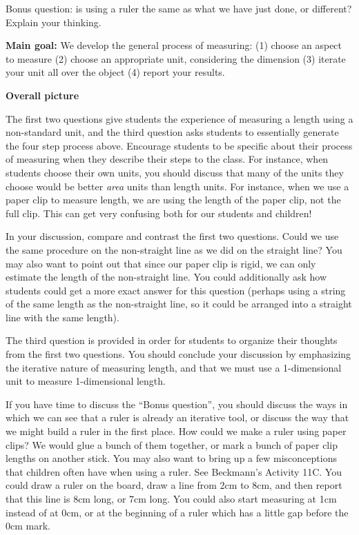 \documentclass[nooutcomes,noauthor]{ximera}
\begin{document}
\begin{problem}
Bonus question: is using a ruler the same as what we have just done, or different? Explain your thinking.
\end{problem}
\pagebreak
\begin{instructorNotes}

{\bf Main goal:} We develop the general process of measuring: (1) choose an aspect to measure (2) choose an appropriate unit, considering the dimension (3) iterate your unit all over the object (4) report your results.


{\bf Overall picture}

The first two questions give students the experience of measuring a length using a non-standard unit, and the third question asks students to essentially generate the four step process above. Encourage students to be specific about their process of measuring when they describe their steps to the class. For instance, when students choose their own units, you should discuss that many of the units they choose would be better {\em area} units than length units. For instance, when we use a paper clip to measure length, we are using the length of the paper clip, not the full clip.  This can get very confusing both for our students and children!

In your discussion, compare and contrast the first two questions. Could we use the same procedure on the non-straight line as we did on the straight line? You may also want to point out that since our paper clip is rigid, we can only estimate the length of the non-straight line. You could additionally ask how students could get a more exact answer for this question (perhaps using a string of the same length as the non-straight line, so it could be arranged into a straight line with the same length).


The third question is provided in order for students to organize their thoughts from the first two questions.  You should conclude your discussion by emphasizing the iterative nature of measuring length, and that we must use a 1-dimensional unit to measure 1-dimensional length.  


If you have time to discuss the ``Bonus question'', you should discuss the ways in which we can see that a ruler is already an iterative tool, or discuss the way that we might build a ruler in the first place. How could we make a ruler using paper clips? We would glue a bunch of them together, or mark a bunch of paper clip lengths on another stick. You may also want to bring up a few misconceptions that children often have when using a ruler.  See Beckmann's Activity 11C.  You could draw a ruler on the board, draw a line from 2cm to 8cm, and then report that this line is 8cm long, or 7cm long. You could also start measuring at 1cm instead of at 0cm, or at the beginning of a ruler which has a little gap before the 0cm mark.




\end{instructorNotes}
\end{document}

